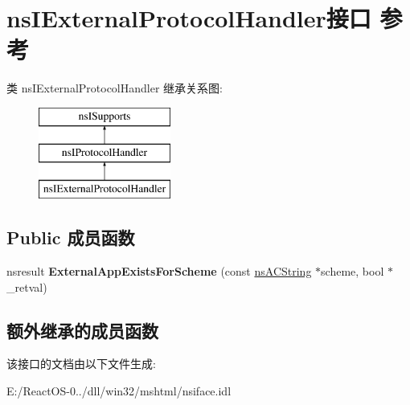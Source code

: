 \hypertarget{interfacens_i_external_protocol_handler}{}\section{ns\+I\+External\+Protocol\+Handler接口 参考}
\label{interfacens_i_external_protocol_handler}
类 ns\+I\+External\+Protocol\+Handler 继承关系图\+:\begin{figure}[H]
\begin{center}
\leavevmode
\includegraphics[height=3.000000cm]{interfacens_i_external_protocol_handler}
\end{center}
\end{figure}
\subsection*{Public 成员函数}
\begin{DoxyCompactItemize}
\item 
\mbox{\label{interfacens_i_external_protocol_handler_ab9f58151f8f9956241caffd4f4d87371}} 
nsresult {\bfseries External\+App\+Exists\+For\+Scheme} (const \hyperlink{structns_c_string_container}{ns\+A\+C\+String} $\ast$scheme, bool $\ast$\+\_\+retval)
\end{DoxyCompactItemize}
\subsection*{额外继承的成员函数}


该接口的文档由以下文件生成\+:\begin{DoxyCompactItemize}
\item 
E\+:/\+React\+O\+S-\/0../dll/win32/mshtml/nsiface.\+idl\end{DoxyCompactItemize}
